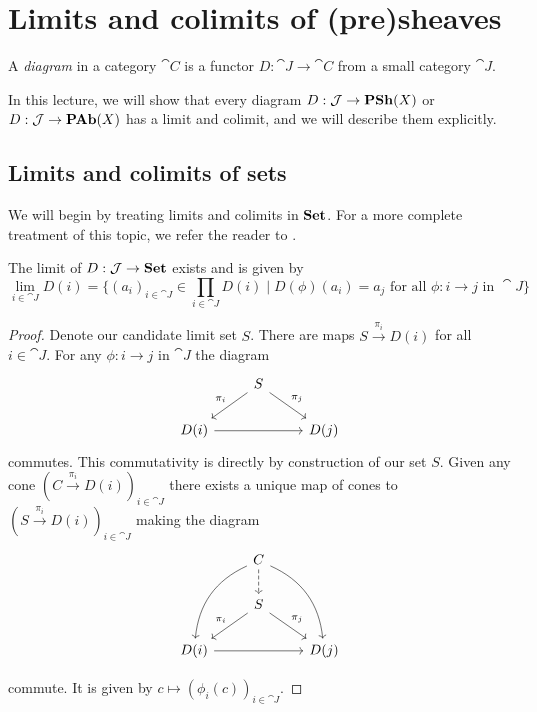 \documentclass[../main.tex]{subfiles}
\begin{document}
\chapter{Limits and colimits of (pre)sheaves}
\begin{defn}
    A \emph{diagram} in a category $\cat C$ is a functor $D: \cat J \to \cat C$ from a small category $\cat J$.
\end{defn}

In this lecture, we will show that every diagram $D: \mathcal{J} \to \operatorname{\mathbf{PSh}}(X)$ or $D: \mathcal{J} \to \operatorname{\mathbf{PAb}}(X)$ has a limit and colimit, and we will describe them explicitly.

\section{Limits and colimits of sets}

We will begin by treating limits and colimits in $\mathbf{Set}$. For a more complete treatment of this topic, we refer the reader to \cite[Chapter~3.2]{riehlCategoryTheoryContext2016}.
\begin{prop}
    The limit of $D: \mathcal{J} \to \mathbf{Set}$ exists and is given by \[
        \lim_{i\in \cat J}D(i) = \{(a_i)_{i \in \cat J} \in \prod_{i \in \cat J}D(i) \mid D(\phi)(a_i) = a_j \text{ for all } \phi: i \to j \text{ in } \cat J\}
    \]
\end{prop}
\begin{proof}
	Denote our candidate limit set $S$. There are maps $S \xrightarrow{\pi_i} D(i)$ for all $i \in \cat J$. For any $\phi: i \to j$ in $\cat J$ the diagram
    \[
      \begin{tikzcd}
                & S \arrow[ld, "\pi_i"'] \arrow[rd, "\pi_j"] &      \\
D(i) \arrow[rr] &                                            & D(j)
\end{tikzcd}
    \]
commutes. This commutativity is directly by construction of our set $S$. Given any cone $(C \xrightarrow{\pi_i} D(i))_{i \in \cat J}$ there exists a unique map of cones to $(S \xrightarrow{\pi_i} D(i))_{i \in \cat J}$ making the diagram
\[
\begin{tikzcd}
                & C \arrow[ldd, bend right] \arrow[rdd, bend left] \arrow[d, dashed] &      \\
                & S \arrow[ld, "\pi_i"'] \arrow[rd, "\pi_j"]                         &      \\
D(i) \arrow[rr] &                                                                    & D(j)
\end{tikzcd}
\]

commute. It is given by $c \mapsto (\phi_i(c))_{i \in \cat J}$.

\end{proof}
\end{document}
